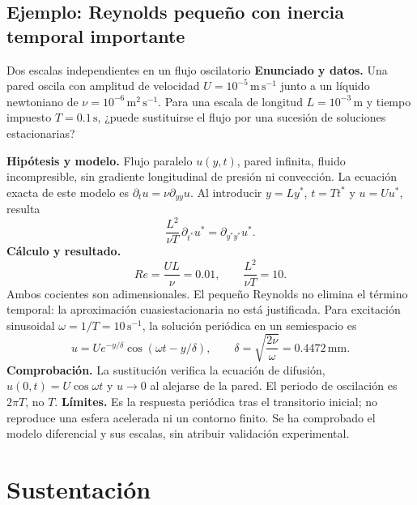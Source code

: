 \documentclass[10pt,openany]{book}
\begin{document}
\subsection{Ejemplo: Reynolds pequeño con inercia temporal importante}
\begin{studiumworked}{Dos escalas independientes en un flujo oscilatorio}
\textbf{Enunciado y datos.} Una pared oscila con amplitud de velocidad
\(U=10^{-5}\,\mathrm{m\,s^{-1}}\) junto a un líquido newtoniano de
\(\nu=10^{-6}\,\mathrm{m^2\,s^{-1}}\). Para una escala de longitud
\(L=10^{-3}\,\mathrm m\) y tiempo impuesto \(T=0.1\,\mathrm s\),
¿puede sustituirse el flujo por una sucesión de soluciones estacionarias?

\textbf{Hipótesis y modelo.} Flujo paralelo \(u(y,t)\), pared infinita,
fluido incompresible, sin gradiente longitudinal de presión ni convección.
La ecuación exacta de este modelo es \(\partial_tu=\nu\partial_{yy}u\).
Al introducir \(y=Ly^*\), \(t=Tt^*\) y \(u=Uu^*\), resulta
\[
 \frac{L^2}{\nu T}\,\partial_{t^*}u^*=\partial_{y^*y^*}u^*.
\]
\textbf{Cálculo y resultado.}
\[
 Re=\frac{UL}{\nu}=0.01,\qquad
 \frac{L^2}{\nu T}=10.
\]
Ambos cocientes son adimensionales. El pequeño Reynolds no elimina
el término temporal: la aproximación cuasiestacionaria no está justificada.
Para excitación sinusoidal \(\omega=1/T=10\,\mathrm{s^{-1}}\),
la solución periódica en un semiespacio es
\[
 u=Ue^{-y/\delta}\cos(\omega t-y/\delta),\qquad
 \delta=\sqrt{\frac{2\nu}{\omega}}=0.4472\,\mathrm{mm}.
\]
\textbf{Comprobación.} La sustitución verifica la ecuación de difusión,
\(u(0,t)=U\cos\omega t\) y \(u\to0\) al alejarse de la pared.
El periodo de oscilación es \(2\pi T\), no \(T\).
\textbf{Límites.} Es la respuesta periódica tras el transitorio inicial;
no reproduce una esfera acelerada ni un contorno finito. Se ha comprobado
el modelo diferencial y sus escalas, sin atribuir validación experimental.
\end{studiumworked}

\section{Sustentación}
\end{document}
